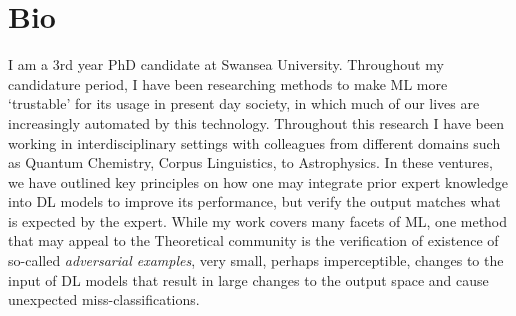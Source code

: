 \documentclass[11pt]{article}
\begin{document}
\section*{Bio}
\label{sec:org1e97366}
I am a 3rd year PhD candidate at Swansea University. Throughout my candidature
period, I have been researching methods to make ML more `trustable' for its usage in
present day society, in which much of our lives are increasingly automated by this
technology. Throughout this research I have been working in interdisciplinary
settings with colleagues from different domains such as Quantum Chemistry, Corpus
Linguistics, to Astrophysics. In these ventures, we have outlined key principles on
how one may integrate prior expert knowledge into DL models to improve its
performance, but verify the output matches what is expected by the expert. While my
work covers many facets of ML, one method that may appeal to the Theoretical
community is the verification of existence of so-called \emph{adversarial examples}, very
small, perhaps imperceptible, changes to the input of DL models that result in large
changes to the output space and cause unexpected miss-classifications.
\end{document}
